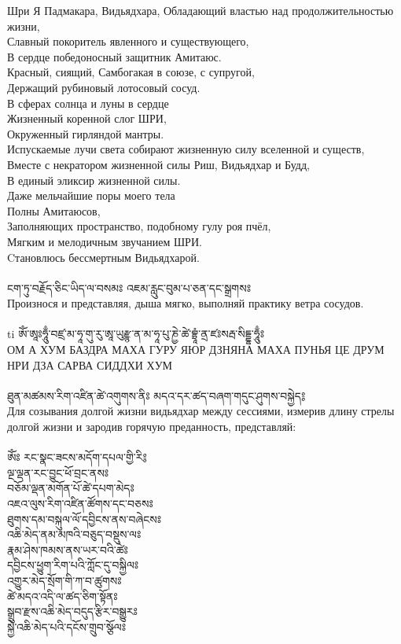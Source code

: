 Шри   Я Падмакара, Видьядхара, 
\indent   Обладающий властью над продолжительностью жизни,\\
Славный покоритель явленного и существующего,\\
В сердце победоносный защитник Амитаюс.\\
Красный, сиящий, Самбогакая в союзе, с супругой,\\
Держащий рубиновый лотосовый сосуд.\\
В сферах солнца и луны в сердце\\
Жизненный коренной слог ШРИ,\\
Окруженный гирляндой мантры.\\
Испускаемые лучи света собирают жизненную силу вселенной и существ,\\
Вместе с некратором жизненной силы Риш, Видьядхар и Будд,\\
В единый эликсир жизненной силы.\\
Даже мельчайшие поры моего тела\\
Полны Амитаюсов,\\
Заполняющих пространство, подобному гулу роя пчёл,\\
Мягким и мелодичным звучанием ШРИ.\\
Cтановлюсь бессмертным Видьядхарой.\\
\\
{\ti ངག་ཏུ་བརྗོད་ཅིང་ཡིད་ལ་བསམཿ  འཇམ་རླུང་བུམ་པ་ཅན་དང་སྒྲགསཿ }\\
Произнося и представляя, дыша мягко, выполняй практику ветра сосудов.\\
\\
{ti ཨོཾ་ཨཱཿཧཱུྃ་བཛྲ་མ་ཧཱ་གུ་རུ་ཨཱ་ཡུརྫྙ་ན་མ་ཧཱ་པུ་ཎྱེ་ཚེ་བྷྲཱཾ་ནྲ་ཛཿསརྦ་སིདྡྷ་ཧཱུྃཿ }\\
ОМ А ХУМ БАЗДРА МАХА ГУРУ ЯЮР ДЗНЯНА МАХА ПУНЬЯ ЦЕ ДРУМ НРИ ДЗА САРВА СИДДХИ ХУМ\\
\\
{\ti ཐུན་མཚམས་རིག་འཛིན་ཚེ་འགུགས་ནིཿ མདའ་དར་ཚད་བཞག་གདུང་ཤུགས་བསྐྱེད༔ }\\
Для созывания долгой жизни видьядхар между сессиями, измерив длину стрелы долгой жизни и зародив горячую преданность, представляй:\\
\\
{\ti
ཨོཾཿ རང་སྣང་ཟངས་མདོག་དཔལ་གྱི་རི༔ \\
ལྔ་ལྡན་རང་བྱུང་ཕོ་བྲང་ནསཿ \\
བཅོམ་ལྡན་མགོན་པོ་ཚེ་དཔག་མེདཿ \\
འཇའ་ལུས་རིག་འཛིན་ཚོགས་དང་བཅསཿ \\
ཐུགས་དམ་བསྐུལ་ལོ་དབྱིངས་ནས་བཞེངསཿ\\
འཆི་མེད་ནམ་མཁའི་བཅུད་བསྡུས་ལཿ \\
རྣམ་ཤེས་ཁམས་ནས་ཡར་བའི་ཚེཿ \\
དབྱིངས་ཕྱུག་རིག་པའི་ཀློང་དུ་བསྐྱིལཿ \\
འགྱུར་མེད་སྲོག་གི་ཀ་བ་ཚུགསཿ \\
ཚེ་མདའ་འདི་ལ་ཚད་ཅིག་སྟོནཿ \\
སྒྲུབ་རྫས་འཆི་མེད་བདུད་རྩིར་བསྒྱུརཿ \\
སྐྱེ་འཆི་མེད་པའི་དངོས་གྲུབ་སྩོལཿ \\}
